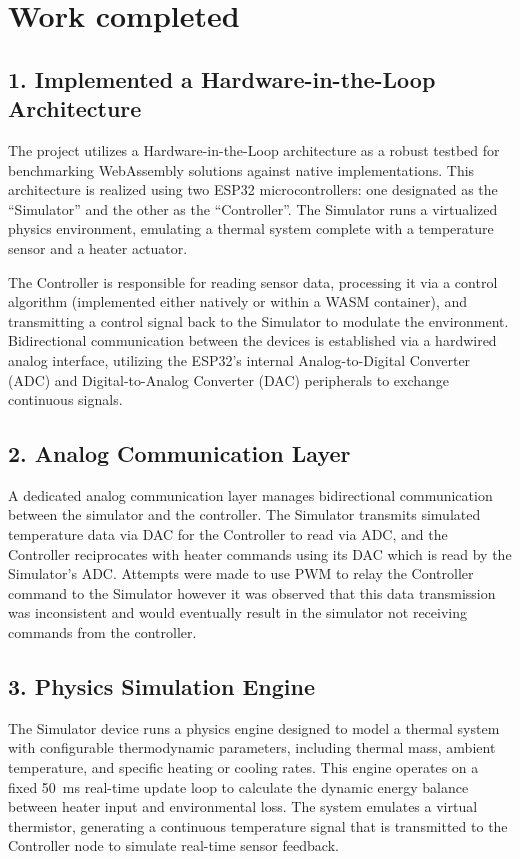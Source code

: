 \documentclass[12pt, a4paper]{report}
\begin{document}
\section*{Work completed}
\subsection*{1. Implemented a Hardware-in-the-Loop Architecture}
The project utilizes a Hardware-in-the-Loop architecture as a robust testbed for benchmarking WebAssembly solutions against native implementations. This architecture is realized using two ESP32 microcontrollers: one designated as the ``Simulator'' and the other as the ``Controller''. The Simulator runs a virtualized physics environment, emulating a thermal system complete with a temperature sensor and a heater actuator.

The Controller is responsible for reading sensor data, processing it via a control algorithm (implemented either natively or within a WASM container), and transmitting a control signal back to the Simulator to modulate the environment. Bidirectional communication between the devices is established via a hardwired analog interface, utilizing the ESP32's internal Analog-to-Digital Converter (ADC) and Digital-to-Analog Converter (DAC) peripherals to exchange continuous signals.

\subsection*{2. Analog Communication Layer}
A dedicated analog communication layer manages bidirectional communication between the simulator and the controller. The Simulator transmits simulated temperature data via DAC for the Controller to read via ADC, and the Controller reciprocates with heater commands using its DAC which is read by the Simulator's ADC. Attempts were made to use PWM to relay the Controller command to the Simulator however it was observed that this data transmission was inconsistent and would eventually result in the simulator not receiving commands from the controller.

\subsection*{3. Physics Simulation Engine}
The Simulator device runs a physics engine designed to model a thermal system with configurable thermodynamic parameters, including thermal mass, ambient temperature, and specific heating or cooling rates. This engine operates on a fixed 50~ms real-time update loop to calculate the dynamic energy balance between heater input and environmental loss. The system emulates a virtual thermistor, generating a continuous temperature signal that is transmitted to the Controller node to simulate real-time sensor feedback.
\end{document}
